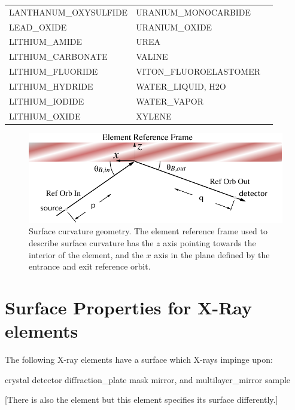 \begin{center}
\begin{longtable}{lll}
LANTHANUM_OXYSULFIDE                & URANIUM_MONOCARBIDE                       \\
LEAD_OXIDE                          & URANIUM_OXIDE                             \\
LITHIUM_AMIDE                       & UREA                                      \\
LITHIUM_CARBONATE                   & VALINE                                    \\
LITHIUM_FLUORIDE                    & VITON_FLUOROELASTOMER                     \\
LITHIUM_HYDRIDE                     & WATER_LIQUID, H2O                         \\
LITHIUM_IODIDE                      & WATER_VAPOR                               \\
LITHIUM_OXIDE                       & XYLENE                                    \\
\end{longtable}
\end{center}


\begin{figure}[tb]
  \centering
  \includegraphics[width=5in]{surface-curvature.pdf}
  \caption[Surface curvature geometry.]
{Surface curvature geometry. The element reference frame used to describe surface curvature has the
$z$ axis pointing towards the interior of the element, and the $x$ axis in the plane defined by
the entrance and exit reference orbit.}
  \label{f:surface}
\end{figure}

\section{Surface Properties for X-Ray elements}
\label{s:s.curve}

The following X-ray elements have a surface which X-rays impinge upon:
\begin{example}
  crystal               
  detector              
  diffraction_plate     
  mask                  
  mirror, and           
  multilayer_mirror     
  sample                
\end{example}
[There is also the  element but this element specifies
its surface differently.]

